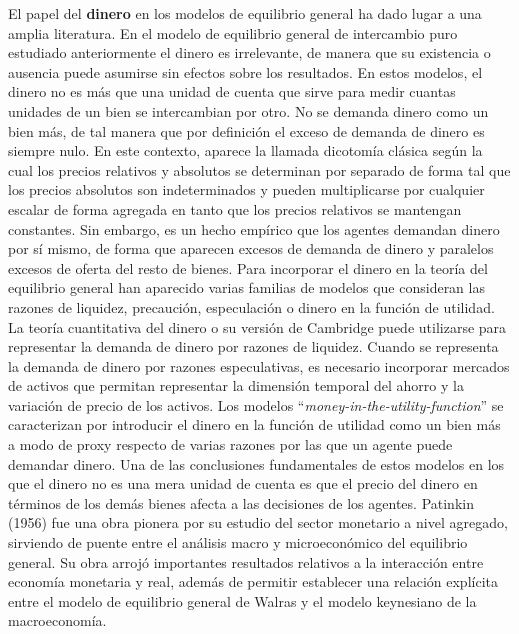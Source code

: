 \documentclass{nuevotema}
\begin{document}
El papel del \textbf{dinero} en los modelos de equilibrio general ha dado lugar a una amplia literatura. En el modelo de equilibrio general de intercambio puro estudiado anteriormente el dinero es irrelevante, de manera que su existencia o ausencia puede asumirse sin efectos sobre los resultados. En estos modelos, el dinero no es más que una unidad de cuenta que sirve para medir cuantas unidades de un bien se intercambian por otro. No se demanda dinero como un bien más, de tal manera que por definición el exceso de demanda de dinero es siempre nulo. En este contexto, aparece la llamada dicotomía clásica según la cual los precios relativos y absolutos se determinan por separado de forma tal que los precios absolutos son indeterminados y pueden multiplicarse por cualquier escalar de forma agregada en tanto que los precios relativos se mantengan constantes. Sin embargo, es un hecho empírico que los agentes demandan dinero por sí mismo, de forma que aparecen excesos de demanda de dinero y paralelos excesos de oferta del resto de bienes. Para incorporar el dinero en la teoría del equilibrio general han aparecido varias familias de modelos que consideran las razones de liquidez, precaución, especulación o dinero en la función de utilidad. La teoría cuantitativa del dinero o su versión de Cambridge puede utilizarse para representar la demanda de dinero por razones de liquidez. Cuando se representa la demanda de dinero por razones especulativas, es necesario incorporar mercados de activos que permitan representar la dimensión temporal del ahorro y la variación de precio de los activos. Los modelos ``\textit{money-in-the-utility-function}'' se caracterizan por introducir el dinero en la función de utilidad como un bien más a modo de proxy respecto de varias razones por las que un agente puede demandar dinero. Una de las conclusiones fundamentales de estos modelos en los que el dinero no es una mera unidad de cuenta es que el precio del dinero en términos de los demás bienes afecta a las decisiones de los agentes. Patinkin (1956) fue una obra pionera por su estudio del sector monetario a nivel agregado, sirviendo de puente entre el análisis macro y microeconómico del equilibrio general. Su obra arrojó importantes resultados relativos a la interacción entre economía monetaria y real, además de permitir establecer una relación explícita entre el modelo de equilibrio general de Walras y el modelo keynesiano de la macroeconomía.
\end{document}
